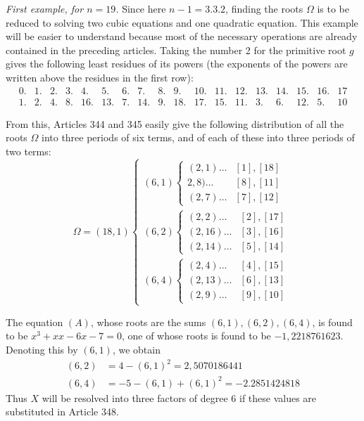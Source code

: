 \textit{First example, for \(n=19\).} Since here \(n-1=3.3.2\), finding the roots \(\Omega\) is to be reduced to solving two cubic equations and one quadratic equation. This example will be easier to understand because most of the necessary operations are already contained in the preceding articles. Taking the number 2 for the primitive root \(g\) gives the following least residues of its powers (the exponents of the powers are written above the residues in the first row): {\small\setlength{\arraycolsep}{2pt}\[\begin{array}{rrrrrrrrrrrrrrrrrr}0.&1.&2.&3.&4.&5.&6.&7.&8.&9.&10.&11.&12.&13.&14.&15.&16.&17\\1.&2.&4.&8.&16.&13.&7.&14.&9.&18.&17.&15.&11.&3.&6.&12.&5.&10\end{array}\]}

From this, Articles 344 and 345 easily give the following distribution of all the roots \(\Omega\) into three periods of six terms, and of each of these into three periods of two terms: \[\Omega=(18,1)\left\{\begin{array}{l}(6,1)\left\{\begin{array}{ll}(2,1)\ldots&[1],[18]\\2,8)\ldots&[8],[11]\\(2,7)\ldots&[7],[12]\end{array}\right.\\[8pt](6,2)\left\{\begin{array}{ll}(2,2)\ldots&[2],[17]\\(2,16)\ldots&[3],[16]\\(2,14)\ldots&[5],[14]\end{array}\right.\\[8pt](6,4)\left\{\begin{array}{ll}(2,4)\ldots&[4],[15]\\(2,13)\ldots&[6],[13]\\(2,9)\ldots&[9],[10]\end{array}\right.\end{array}\right.\]

The equation \((A)\), whose roots are the sums \((6,1),\allowbreak (6,2),\allowbreak (6,4)\), is found to be \(x^3+xx-6x-7=0\), one of whose roots is found to be \(-1{,}2218761623\). Denoting this by \((6,1)\), we obtain
\[\begin{aligned}(6,2)&=4-(6,1)^2=2{,}5070186441\\(6,4)&=-5-(6,1)+(6,1)^2=-2.2851424818\end{aligned}\] Thus \(X\) will be resolved into three factors of degree 6 if these values are substituted in Article 348.

